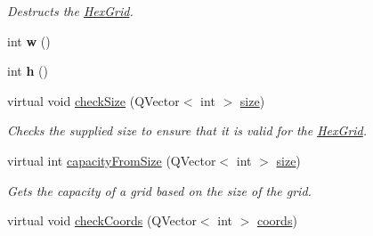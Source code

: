 \begin{DoxyCompactItemize}
\begin{DoxyCompactList}\small\item\em \-Destructs the \hyperlink{classhsom_1_1_hex_grid}{\-Hex\-Grid}. \end{DoxyCompactList}\item 
\hypertarget{classhsom_1_1_hex_grid_a2c1dfa6a6ecf7b75233aceb4384de4e0}{int {\bfseries w} ()}\label{classhsom_1_1_hex_grid_a2c1dfa6a6ecf7b75233aceb4384de4e0}

\item 
\hypertarget{classhsom_1_1_hex_grid_a28440198319e03676056109c7f89a43f}{int {\bfseries h} ()}\label{classhsom_1_1_hex_grid_a28440198319e03676056109c7f89a43f}

\item 
\hypertarget{classhsom_1_1_hex_grid_a614c32e28e2bf67015490c2e66bfb5c1}{virtual void \hyperlink{classhsom_1_1_hex_grid_a614c32e28e2bf67015490c2e66bfb5c1}{check\-Size} (\-Q\-Vector$<$ int $>$ \hyperlink{classhsom_1_1_grid_a3e846473299eb2c7c259659eb61a6234}{size})}\label{classhsom_1_1_hex_grid_a614c32e28e2bf67015490c2e66bfb5c1}

\begin{DoxyCompactList}\small\item\em \-Checks the supplied size to ensure that it is valid for the \hyperlink{classhsom_1_1_hex_grid}{\-Hex\-Grid}. \end{DoxyCompactList}\item 
\hypertarget{classhsom_1_1_hex_grid_a782533d1c9c15f1da2f0b9c7af44c48d}{virtual int \hyperlink{classhsom_1_1_hex_grid_a782533d1c9c15f1da2f0b9c7af44c48d}{capacity\-From\-Size} (\-Q\-Vector$<$ int $>$ \hyperlink{classhsom_1_1_grid_a3e846473299eb2c7c259659eb61a6234}{size})}\label{classhsom_1_1_hex_grid_a782533d1c9c15f1da2f0b9c7af44c48d}

\begin{DoxyCompactList}\small\item\em \-Gets the capacity of a grid based on the size of the grid. \end{DoxyCompactList}\item 
\hypertarget{classhsom_1_1_hex_grid_a9fb21460ce970fdd8d3075ead9db49a7}{virtual void \hyperlink{classhsom_1_1_hex_grid_a9fb21460ce970fdd8d3075ead9db49a7}{check\-Coords} (\-Q\-Vector$<$ int $>$ \hyperlink{classhsom_1_1_hex_grid_a2016e6d1a0e8b01a705a7d9040797329}{coords})}\label{classhsom_1_1_hex_grid_a9fb21460ce970fdd8d3075ead9db49a7}


\end{DoxyCompactItemize}
